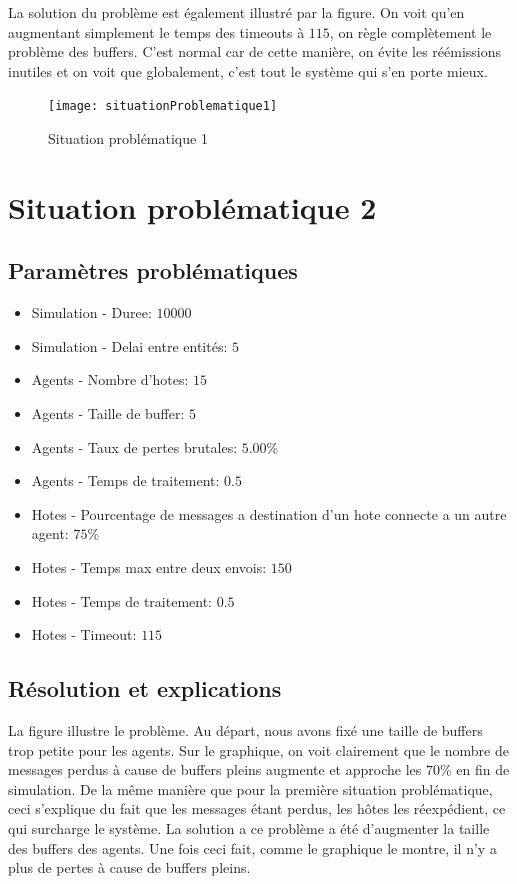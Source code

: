 \documentclass[a4paper,11pt]{article}
\begin{document}
La solution du problème est également illustré par la figure. On voit qu'en augmentant simplement le temps des timeouts à $115$, on règle complètement le problème des buffers. C'est normal car de cette manière, on évite les réémissions inutiles et on voit que globalement, c'est tout le système qui s'en porte mieux.

\begin{figure}[h!t]
  \centering
    \texttt{[image: situationProblematique1]}
  \caption{Situation problématique 1}
  \label{fig:situationproblematique1}
\end{figure}






\section{Situation problématique 2}
\subsection{Paramètres problématiques}
\begin{itemize}
 \item Simulation - Duree: $10000$
 \item Simulation - Delai entre entités: $5$
 \item Agents - Nombre d'hotes: $15$
 \item Agents - Taille de buffer: \textbf{$5$}
 \item Agents - Taux de pertes brutales: $5.00$\%
 \item Agents - Temps de traitement: $0.5$
 \item Hotes - Pourcentage de messages a destination d'un hote connecte a un autre agent: $75$\%
 \item Hotes - Temps max entre deux envois: $150$
 \item Hotes - Temps de traitement: $0.5$
 \item Hotes - Timeout: $115$
\end{itemize}

\subsection{Résolution et explications}
La figure  illustre le problème. Au départ, nous avons fixé une taille de buffers trop petite pour les agents. Sur le graphique, on voit clairement que le nombre de messages perdus à cause de buffers pleins augmente et approche les $70$\% en fin de simulation. De la même manière que pour la première situation problématique, ceci s'explique du fait que les messages étant perdus, les hôtes les réexpédient, ce qui surcharge le système. La solution a ce problème a été d'augmenter la taille des buffers des agents. Une fois ceci fait, comme le graphique le montre, il n'y a plus de pertes à cause de buffers pleins.
\end{document}
